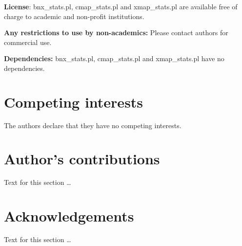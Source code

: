 \documentclass{bmcart}
\begin{document}
\textbf{License}: bnx\_stats.pl, cmap\_stats.pl and xmap\_stats.pl are available free of charge to academic and non-profit institutions.

\textbf{Any restrictions to use by non-academics:} Please contact authors for commercial use.

\textbf{Dependencies:} bnx\_stats.pl, cmap\_stats.pl and xmap\_stats.pl have no dependencies.


\begin{backmatter}

\section*{Competing interests}
  The authors declare that they have no competing interests.

\section*{Author's contributions}
    Text for this section \ldots

\section*{Acknowledgements}
  Text for this section \ldots



\end{backmatter}
\end{document}
